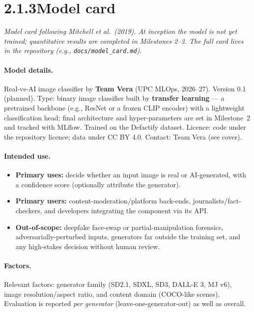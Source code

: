 \documentclass[11pt]{article}
\begin{document}
\newpage
\section*{2.1.3\quad Model card}
\textit{Model card following Mitchell et al.\ (2019). At inception the model is not yet trained; quantitative results are completed in Milestones 2--3. The full card lives in the repository (e.g., \texttt{docs/model\_card.md}).}

\paragraph{Model details.} Real-vs-AI image classifier by \textbf{Team Vera} (UPC MLOps, 2026--27). Version 0.1 (planned). Type: binary image classifier built by \textbf{transfer learning} --- a pretrained backbone (e.g., ResNet or a frozen CLIP encoder) with a lightweight classification head; final architecture and hyper-parameters are set in Milestone~2 and tracked with MLflow. Trained on the Defactify dataset. Licence: code under the repository licence; data under CC BY 4.0. Contact: Team Vera (see cover).

\paragraph{Intended use.}
\begin{itemize}[nosep,leftmargin=1.4em]
  \item \textbf{Primary uses:} decide whether an input image is real or AI-generated, with a confidence score (optionally attribute the generator).
  \item \textbf{Primary users:} content-moderation/platform back-ends, journalists/fact-checkers, and developers integrating the component via its API.
  \item \textbf{Out-of-scope:} deepfake face-swap or partial-manipulation forensics, adversarially-perturbed inputs, generators far outside the training set, and any high-stakes decision without human review.
\end{itemize}

\paragraph{Factors.} Relevant factors: generator family (SD2.1, SDXL, SD3, DALL-E 3, MJ v6), image resolution/aspect ratio, and content domain (COCO-like scenes). Evaluation is reported \emph{per generator} (leave-one-generator-out) as well as overall.
\end{document}
